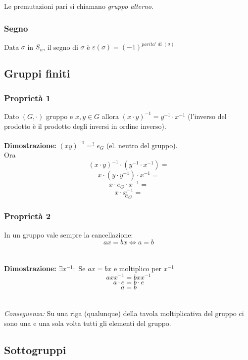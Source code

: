 Le premutazioni pari si chiamano \textit{gruppo alterno}.

\subsubsection{Segno}

Data \(\sigma\) in \(S_n\), il segno di \(\sigma\) è \(\varepsilon (\sigma)=(-1)^{parita'\;di\;(\sigma)}\)

\subsection{Gruppi finiti}

\subsubsection{Proprietà 1}

Dato \((G,\cdot)\) gruppo e \(x,y\in G\) allora \((x\cdot y)^{-1}=y^{-1}\cdot x^{-1}\) (l'inverso del prodotto è il prodotto degli inversi in ordine inverso).
\\\\
\textbf{Dimostrazione:} \((xy)^{-1}=^? e_G\) (el. neutro del gruppo).
\\Ora 
\[(x\cdot y)^{-1}\cdot (y^{-1}\cdot x^{-1})=\]
\[x\cdot (y\cdot y^{-1})\cdot x^{-1}=\]
\[x\cdot e_G\cdot x^{-1}=\]
\[x\cdot x^{-1}=\]
\[e_G\]

\subsubsection{Proprietà 2}
In un gruppo vale sempre la cancellazione:
\[ax=bx\Leftrightarrow a=b\]
\\\\
\textbf{Dimostrazione:} \(\exists x^{-1}:\) Se \(ax=bx\) e moltiplico per \(x^{-1}\)
\[axx^{-1}=bxx^{-1}\]
\[a\cdot e=b\cdot e\]
\[a=b\]
\\\\\textit{Conseguenza:} Su una riga (qualunque) della tavola moltiplicativa del gruppo ci sono una e una sola volta tutti gli elementi del gruppo.

\subsection{Sottogruppi}